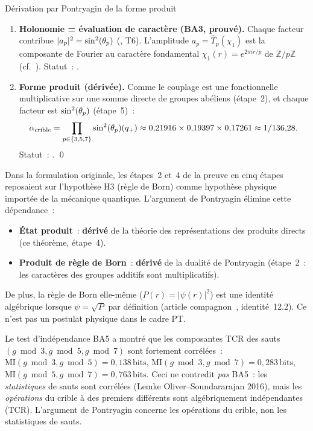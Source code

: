 \documentclass[12pt,a4paper]{article}
\begin{document}
\begin{thmbox}{Dérivation par Pontryagin de la forme produit}
\begin{enumerate}[leftmargin=*, label=\textbf{Étape \arabic*.}]
\item \textbf{Holonomie = évaluation de caractère (BA3, prouvé).}
  Chaque facteur contribue $|a_p|^2 = \sin^2(\theta_{p})$
  (\cite{companion_M2}, T6). L'amplitude $a_p = \hat{T}_p(\chi_1)$
  est la composante de Fourier au caractère fondamental
  $\chi_1(r) = e^{2\pi i r/p}$ de $\mathbb{Z}/p\mathbb{Z}$
  (cf.~\cite{companion_M2}). Statut~: \THMTAG.

\item \textbf{Forme produit (dérivée).}
  Comme le couplage est une fonctionnelle multiplicative sur une
  somme directe de groupes abéliens (étape~2), et chaque facteur
  est $\sin^2(\theta_{p})$ (étape~5)~:
  \begin{equation}
    \alpha_{\rm crible} = \prod_{p \in \{3,5,7\}} \sin^2(\theta_{p})(q_{+})
    \approx 0{,}21916 \times 0{,}19397 \times 0{,}17261 \approx 1/136{,}28.
    \label{eq:alpha_bare:ch09}
  \end{equation}
  Statut~: \DERTAG. \qed
\end{enumerate}
\end{thmbox}

\begin{remarque}
\label{rem:pontryagin_upgrade}
Dans la formulation originale, les étapes~2 et~4 de la preuve en
cinq étapes reposaient sur l'hypothèse H3 (règle de Born) comme
hypothèse physique importée de la mécanique quantique. L'argument
de Pontryagin élimine cette dépendance~:
\begin{itemize}[nosep]
\item \textbf{État produit}~: \textbf{dérivé} de la théorie des
  représentations des produits directs (ce théorème, étape~4).
\item \textbf{Produit de règle de Born}~: \textbf{dérivé} de la
  dualité de Pontryagin (étape~2~: les caractères des groupes
  additifs sont multiplicatifs).
\end{itemize}
De plus, la règle de Born elle-même ($P(r) = |\psi(r)|^2$) est une
identité algébrique lorsque $\psi = \sqrt{P}$ par définition (article
compagnon~\cite{companion_physics}, identité~12.2). Ce n'est pas un
postulat physique dans le cadre PT.
\end{remarque}

\begin{remarque}
\label{rem:MI_test}
Le test d'indépendance BA5 a montré que les composantes TCR des
sauts $(g \bmod 3, g \bmod 5, g \bmod 7)$ sont fortement corrélées~:
$\mathrm{MI}(g\!\bmod 3, g\!\bmod 5) = 0{,}138\,\mathrm{bits}$,
$\mathrm{MI}(g\!\bmod 3, g\!\bmod 7) = 0{,}283\,\mathrm{bits}$,
$\mathrm{MI}(g\!\bmod 5, g\!\bmod 7) = 0{,}763\,\mathrm{bits}$.
Ceci ne contredit \emph{pas} BA5~: les \emph{statistiques} de sauts
sont corrélées (Lemke Oliver--Soundararajan 2016), mais les
\emph{opérations} du crible à des premiers différents sont
algébriquement indépendantes (TCR). L'argument de Pontryagin
concerne les opérations du crible, non les statistiques de sauts.
\end{remarque}
\end{document}
